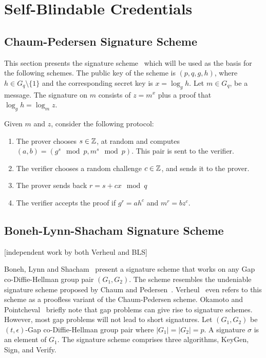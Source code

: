 \chapter{Self-Blindable Credentials}

\section{Chaum-Pedersen Signature Scheme}

This section presents the signature scheme~\cite{ChaumPedersen93} which will be
used as the basis for the following schemes. The public key of the scheme is
$(p, q, g, h)$, where $h \in G_q \setminus \{1\}$ and the corresponding secret key is
$x = \log_g h$. Let $m \in G_q$, be a message. The signature on $m$ consists of
$z = m^x$ plus a proof that $\log_g h = \log_m z$.

Given $m$ and $z$, consider the following protocol:
\begin{enumerate}
  \item The prover chooses $s \in \mathbb{Z}$, at random and computes
    $(a, b) = (g^s \mod p, m^s \mod p)$. This pair is sent to the verifier.
  \item The verifier chooses a random challenge $c \in \mathbb{Z}$, and sends it to the
    prover.
  \item The prover sends back $r = s + cx \mod q$
  \item The verifier accepts the proof if $g^r = ah^c$ and $m^r = bz^c$.
\end{enumerate}

\section{Boneh-Lynn-Shacham Signature Scheme}

[independent work by both Verheul and BLS]

Boneh, Lynn and Shacham~\cite{BonehLS01,BonehLS04} present a signature scheme
that works on any Gap co-Diffie-Hellman group pair $(G_1, G_2)$. The scheme
resembles the undeniable signature scheme proposed by Chaum and
Pedersen~\cite{ChaumPedersen93}. Verheul~\cite{Verheul01} even refers to this
scheme as a proofless variant of the Chaum-Pedersen scheme. Okamoto and
Pointcheval~\cite{OkamotoPointCheval01} briefly note that gap problems can give
rise to signature schemes. However, most gap problems will not lead to short
signatures. Let $(G_1, G_2)$ be $(t, \epsilon)$-Gap co-Diffie-Hellman group
pair where $|G_1| = |G_2| = p$. A signature $\sigma$ is an element of $G_1$.
The signature scheme comprises three algorithms, KeyGen, Sign, and Verify.

